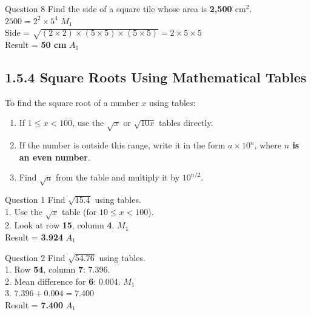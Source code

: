\documentclass[12pt, a4paper, oneside]{article}
\begin{document}
\begin{solvingbox}{Question 8}
Find the side of a square tile whose area is \textbf{2,500 $\text{cm}^2$}. \\
$2500 = 2^2 \times 5^4$ \hfill $M_1$ \\
Side = $\sqrt{(2 \times 2) \times (5 \times 5) \times (5 \times 5)} = 2 \times 5 \times 5$ \\
Result = \textbf{50 cm} \hfill $A_1$
\end{solvingbox}

\subsection*{1.5.4 Square Roots Using Mathematical Tables}

\begin{tcolorbox}[colback=lightgrey, colframe=primaryblue, title=\textbf{Step-by-Step Table Usage}, arc=5pt]
    To find the square root of a number $x$ using tables:
    \begin{enumerate}
        \item If $1 \leq x < 100$, use the $\sqrt{x}$ or $\sqrt{10x}$ tables directly.
        \item If the number is outside this range, write it in the form $a \times 10^n$, where \textbf{$n$ is an even number}.
        \item Find $\sqrt{a}$ from the table and multiply it by $10^{n/2}$.
    \end{enumerate}
\end{tcolorbox}

\begin{solvingbox}{Question 1}
Find $\sqrt{15.4}$ using tables. \\
1. Use the $\sqrt{x}$ table (for $10 \leq x < 100$). \\
2. Look at row \textbf{15}, column \textbf{4}. \hfill $M_1$ \\
Result = \textbf{3.924} \hfill $A_1$
\end{solvingbox}

\begin{solvingbox}{Question 2}
Find $\sqrt{54.76}$ using tables. \\
1. Row \textbf{54}, column \textbf{7}: 7.396. \\
2. Mean difference for \textbf{6}: 0.004. \hfill $M_1$ \\
3. $7.396 + 0.004 = 7.400$ \\
Result = \textbf{7.400} \hfill $A_1$
\end{solvingbox}
\end{document}
